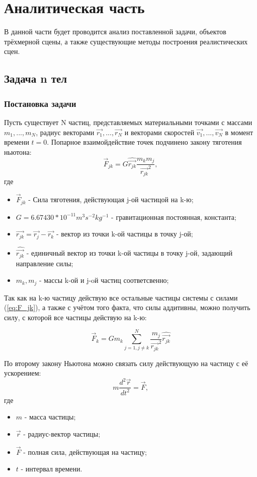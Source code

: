 \chapter{Аналитическая часть}

В данной части будет проводится анализ поставленной задачи, объектов трёхмерной сцены, а также существующие методы построения реалистических сцен.

\section{Задача n тел}
\subsection{Постановка задачи}
Пусть существует N частиц, представляемых материальными точками с массами $m_1, ..., m_N$, радиус векторами $\vec{r_1}, ..., \vec{r_N}$ и векторами скоростей $\vec{v_1}, ..., \vec{v_N}$ в момент времени $t=0$.
Попарное взаимойдействие точек подчинено закону тяготения ньютона:
\begin{equation}
	\label{eq:F_jk}
	\vec{F}_{jk} = G\hat{\vec{r_{jk}}}\frac{m_km_j}{\vec{r_{jk}}^2},
\end{equation}
где
\begin{itemize}
	\item $\vec{F}_{jk}$ - Сила тяготения, действующая j-ой частицой на k-ю;
	\item $G = 6.67430 * 10^{-11} m^3s^{-2}kg^{-1}$ - гравитационная постоянная, константа;
	\item $\vec{r_{jk}} = \vec{r_j} - \vec{r_k}$ - вектор из точки k-ой частицы в точку j-ой;
	\item $\hat{\vec{r_{jk}}}$ - единичный вектор из точки k-ой частицы в точку j-ой, задающий направление силы;
	\item $m_k, m_j$ - массы k-ой и j-oй частиц соответсвенно;
\end{itemize}

Так как на k-ю частицу действую все остальные частицы системы с силами (\ref{eq:F_jk}), а также с учётом того факта, что силы аддитивны, можно получить силу, с которой все частицы действую на k-ю:

\begin{equation}
	\label{eq:F_sumk}
	\vec{F}_{k} = Gm_k\sum_{j=1, j \neq k}^{N}{\frac{m_j}{\vec{r_{jk}}^2}\hat{\vec{r_{jk}}}}
\end{equation}

По второму закону Ньютона можно связать силу действующую на частицу с её ускорением:
\begin{equation}
	\label{eq:newton2}
	m\frac{d^2\vec{r}}{dt^2} = \vec{F},
\end{equation}
где
\begin{itemize}
	\item $m$ - масса частицы;
	\item $\vec{r}$ - радиус-вектор частицы;
	\item $\vec{F}$ - полная сила, действующая на частицу;
	\item $t$ - интервал времени.
\end{itemize}

